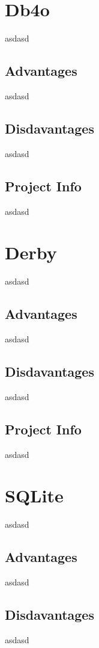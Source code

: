 		\section{Db4o}
asdasd

		
			\subsection{Advantages}
asdasd
			
			\subsection{Disdavantages}
asdasd
			
			\subsection{Project Info}
asdasd
				
		
		
		
		\section{Derby}
		asdasd

		
			\subsection{Advantages}
asdasd
			
			\subsection{Disdavantages}
asdasd
			
			\subsection{Project Info}
asdasd
		
		\section{SQLite}
		asdasd

		
			\subsection{Advantages}
asdasd
			
			\subsection{Disdavantages}
asdasd
			
